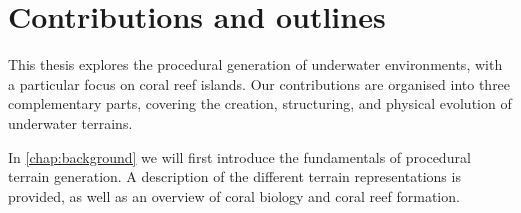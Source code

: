 







\section{Contributions and outlines}
This thesis explores the procedural generation of underwater environments, with a particular focus on coral reef islands. Our contributions are organised into three complementary parts, covering the creation, structuring, and physical evolution of underwater terrains.

In \cref{chap:background} we will first introduce the fundamentals of procedural terrain generation. A description of the different terrain representations is provided, as well as an overview of coral biology and coral reef formation.

